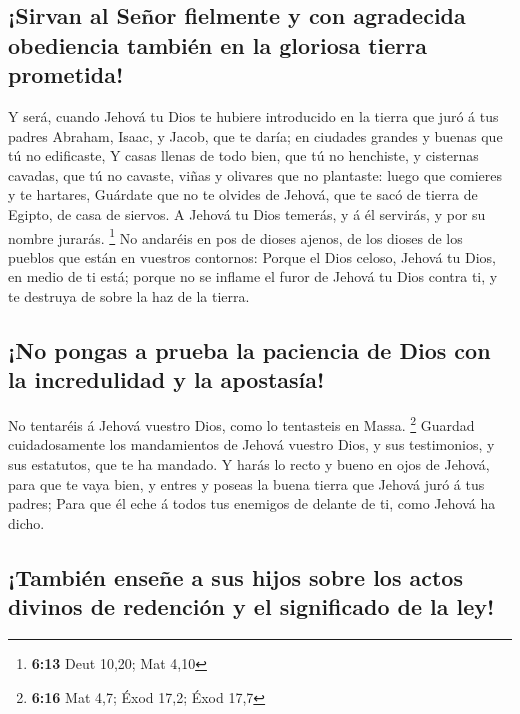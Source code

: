 \hypertarget{sirvan-al-seuxf1or-fielmente-y-con-agradecida-obediencia-tambiuxe9n-en-la-gloriosa-tierra-prometida}{%
\subsection{¡Sirvan al Señor fielmente y con agradecida obediencia
también en la gloriosa tierra
prometida!}\label{sirvan-al-seuxf1or-fielmente-y-con-agradecida-obediencia-tambiuxe9n-en-la-gloriosa-tierra-prometida}}

 Y será, cuando Jehová tu Dios te hubiere introducido en
la tierra que juró á tus padres Abraham, Isaac, y Jacob, que te daría;
en ciudades grandes y buenas que tú no edificaste,  Y
casas llenas de todo bien, que tú no henchiste, y cisternas cavadas, que
tú no cavaste, viñas y olivares que no plantaste: luego que comieres y
te hartares,  Guárdate que no te olvides de Jehová, que
te sacó de tierra de Egipto, de casa de siervos.  A
Jehová tu Dios temerás, y á él servirás, y por su nombre jurarás.
\footnote{\textbf{6:13} Deut 10,20; Mat 4,10}  No
andaréis en pos de dioses ajenos, de los dioses de los pueblos que están
en vuestros contornos:  Porque el Dios celoso, Jehová tu
Dios, en medio de ti está; porque no se inflame el furor de Jehová tu
Dios contra ti, y te destruya de sobre la haz de la tierra.

\hypertarget{no-pongas-a-prueba-la-paciencia-de-dios-con-la-incredulidad-y-la-apostasuxeda}{%
\subsection{¡No pongas a prueba la paciencia de Dios con la incredulidad
y la
apostasía!}\label{no-pongas-a-prueba-la-paciencia-de-dios-con-la-incredulidad-y-la-apostasuxeda}}

 No tentaréis á Jehová vuestro Dios, como lo tentasteis
en Massa. \footnote{\textbf{6:16} Mat 4,7; Éxod 17,2; Éxod 17,7}
 Guardad cuidadosamente los mandamientos de Jehová
vuestro Dios, y sus testimonios, y sus estatutos, que te ha mandado.
 Y harás lo recto y bueno en ojos de Jehová, para que te
vaya bien, y entres y poseas la buena tierra que Jehová juró á tus
padres;  Para que él eche á todos tus enemigos de delante
de ti, como Jehová ha dicho.

\hypertarget{tambiuxe9n-enseuxf1e-a-sus-hijos-sobre-los-actos-divinos-de-redenciuxf3n-y-el-significado-de-la-ley}{%
\subsection{¡También enseñe a sus hijos sobre los actos divinos de
redención y el significado de la
ley!}\label{tambiuxe9n-enseuxf1e-a-sus-hijos-sobre-los-actos-divinos-de-redenciuxf3n-y-el-significado-de-la-ley}}


